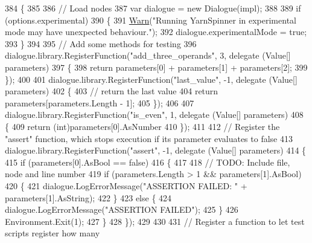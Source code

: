 \begin{DoxyCode}
384         \{
385 
386             \textcolor{comment}{// Load nodes}
387             var dialogue = \textcolor{keyword}{new} Dialogue(impl);
388 
389             \textcolor{keywordflow}{if} (options.experimental)
390             \{
391                 \hyperlink{a00185_a979bb6f049b6c5294f745a19e24ddd9d}{Warn}(\textcolor{stringliteral}{"Running YarnSpinner in experimental mode may have unexpected behaviour."});
392                 dialogue.experimentalMode = \textcolor{keyword}{true};
393             \}
394 
395             \textcolor{comment}{// Add some methods for testing}
396             dialogue.library.RegisterFunction(\textcolor{stringliteral}{"add\_three\_operands"}, 3, delegate (Value[] parameters)
397             \{
398                 \textcolor{keywordflow}{return} parameters[0] + parameters[1] + parameters[2];
399             \});
400 
401             dialogue.library.RegisterFunction(\textcolor{stringliteral}{"last\_value"}, -1, delegate (Value[] parameters)
402             \{
403                 \textcolor{comment}{// return the last value}
404                 \textcolor{keywordflow}{return} parameters[parameters.Length - 1];
405             \});
406 
407             dialogue.library.RegisterFunction(\textcolor{stringliteral}{"is\_even"}, 1, delegate (Value[] parameters)
408             \{
409                 \textcolor{keywordflow}{return} (\textcolor{keywordtype}{int})parameters[0].AsNumber %
410             \});
411 
412             \textcolor{comment}{// Register the "assert" function, which stops execution if its parameter evaluates to false}
413             dialogue.library.RegisterFunction(\textcolor{stringliteral}{"assert"}, -1, delegate (Value[] parameters)
414             \{
415                 \textcolor{keywordflow}{if} (parameters[0].AsBool == \textcolor{keyword}{false})
416                 \{
417 
418                     \textcolor{comment}{// TODO: Include file, node and line number}
419                     \textcolor{keywordflow}{if} (parameters.Length > 1 && parameters[1].AsBool)
420                     \{
421                         dialogue.LogErrorMessage(\textcolor{stringliteral}{"ASSERTION FAILED: "} + parameters[1].AsString);
422                     \}
423                     \textcolor{keywordflow}{else} \{
424                         dialogue.LogErrorMessage(\textcolor{stringliteral}{"ASSERTION FAILED"});
425                     \}
426                     Environment.Exit(1);
427                 \}
428             \});
429 
430 
431             \textcolor{comment}{// Register a function to let test scripts register how many}

\end{DoxyCode}
